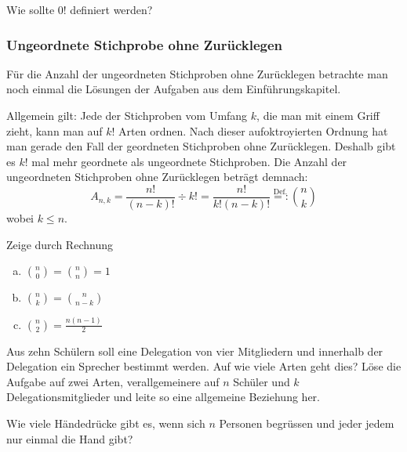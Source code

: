 \documentclass[%
11pt,%
twoside,%
titlepage,%
german,%
headsepline%
]{scrartcl}
\begin{document}
\begin{ueb}[Sonderfall]
Wie sollte $0!$ definiert werden?
\end{ueb}

\subsubsection{Ungeordnete Stichprobe ohne Zurücklegen}
Für die Anzahl der ungeordneten Stichproben ohne Zurücklegen betrachte man noch einmal die Lösungen der Aufgaben aus dem Einführungskapitel.

Allgemein gilt: Jede der Stichproben vom Umfang $k$, die man mit einem Griff zieht, kann man auf $k!$ Arten ordnen. Nach dieser aufoktroyierten Ordnung hat man gerade den Fall der geordneten Stichproben ohne Zurücklegen. Deshalb gibt es $k!$ mal mehr geordnete als ungeordnete Stichproben.
Die Anzahl der ungeordneten Stichproben ohne Zurücklegen beträgt demnach:
$$A_{n,k}=\frac{n!}{(n-k)!}\div k!=\frac{n!}{k!(n-k)!}\stackrel{\text{Def.}}{=:}\binom{n}{k}$$
wobei $k\leq n$.

\begin{ueb}[Binomialkoeffizienten]

Zeige durch Rechnung
\begin{enumerate}[a)]
\item $\binom{n}{0}=\binom{n}{n}=1$
\item $\binom{n}{k}=\binom{n}{n-k}$
\item $\binom{n}{2}=\frac{n(n-1)}{2}$
\end{enumerate}
\end{ueb}

\begin{ueb}[Delegation]
Aus zehn Schülern soll eine Delegation von vier Mitgliedern und innerhalb der Delegation ein Sprecher bestimmt werden. Auf wie viele Arten geht dies? Löse die Aufgabe auf zwei Arten, verallgemeinere auf $n$ Schüler und $k$ Delegationsmitglieder und leite so eine allgemeine Beziehung her.
\end{ueb}

\begin{ueb}
Wie viele Händedrücke gibt es, wenn sich $n$ Personen begrüssen und jeder jedem nur einmal die Hand gibt?
\end{ueb}
\end{document}
